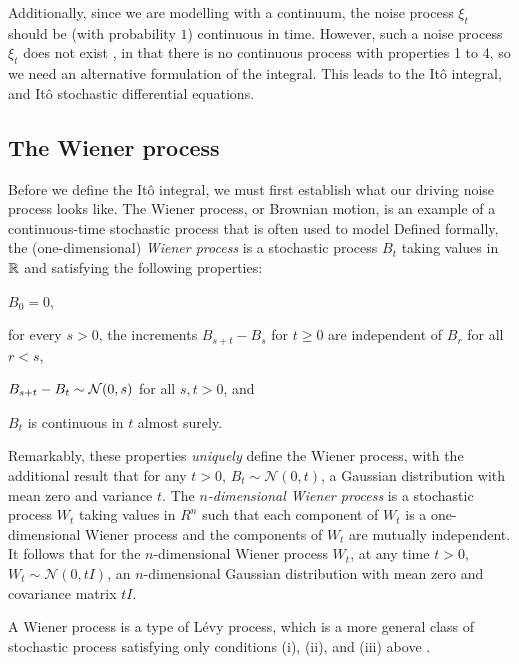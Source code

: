 Additionally, since we are modelling with a continuum, the noise process \(\xi_t\) should be (with probability \(1\)) continuous in time.
However, such a noise process \(\xi_t\) does not exist \citehere, in that there is no continuous process with properties 1 to 4, so we need an alternative formulation of the integral.
This leads to the It\^o integral, and It\^o stochastic differential equations.



\subsection{The Wiener process}
Before we define the It\^o integral, we must first establish what our driving noise process looks like.
The Wiener process, or Brownian motion, is an example of a continuous-time stochastic process that is often used to model 
Defined formally, the (one-dimensional) \emph{Wiener process} is a stochastic process \(B_t\) taking values in \(\mathbb{R}\) and satisfying the following properties:
\begin{romanate}
	\item \(B_0 = 0\),
	\item for every \(s > 0\), the increments \(B_{s + t} - B_{s}\) for \(t \geq 0\) are independent of \(B_r\) for all \(r < s\),
	\item \(B_{s + t} - B_t \sim\mathcal{N}\!\left(0, s\right)\) for all \(s,t > 0\), and
	\item \(B_t\) is continuous in \(t\) almost surely.
\end{romanate}
Remarkably, these properties \emph{uniquely} define the Wiener process, with the additional result that for any \(t > 0\), \(B_t \sim \mathcal{N}\left(0, t\right)\), a Gaussian distribution with mean zero and variance \(t\).
The \emph{\(n\)-dimensional Wiener process} is a stochastic process \(W_t\) taking values in \(R^n\) such that each component of \(W_t\) is a one-dimensional Wiener process and the components of \(W_t\) are mutually independent.
It follows that for the \(n\)-dimensional Wiener process \(W_t\), at any time \(t > 0\), \(W_t \sim \mathcal{N}\left(0, tI\right)\), an \(n\)-dimensional Gaussian distribution with mean zero and covariance matrix \(tI\).

A Wiener process is a type of L\'evy process, which is a more general class of stochastic process satisfying only conditions (i), (ii), and (iii) above \citep{Applebaum_2004_LevyProcessesStochastic}.



